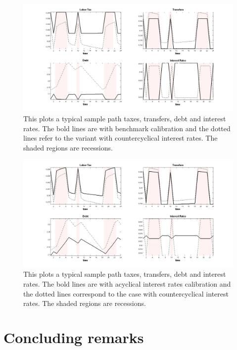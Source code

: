 \documentclass[thmsb,11pt]{article}
\begin{document}
\begin{figure}[htp]
\includegraphics[width=\textwidth]{Draft25Graphs/DiscoutFactorComparison.png}
\caption{This plots a typical sample path taxes, transfers, debt and interest rates. The bold lines are with  benchmark calibration and the dotted lines refer to the variant with countercyclical interest rates. The shaded regions are recessions.}
\label{fig:DiscoutFactorComparison}
\end{figure}

\begin{figure}[htp]
\centering
\includegraphics[width=\textwidth]{Draft25Graphs/DiscoutFactorComparison2.png}
\caption{This plots a typical sample path taxes, transfers, debt and interest rates.  The bold lines  are with acyclical interest rates calibration and the dotted lines correspond to the case with countercyclical interest rates. The shaded regions are recessions.}
\label{fig:DiscoutFactorComparison2}
\end{figure}

\smallskip


\section{Concluding remarks\label{sec:conclude}}
\end{document}
